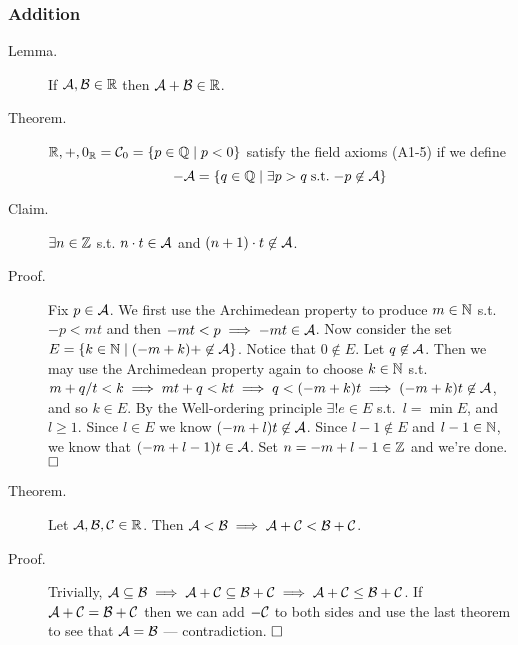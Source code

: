 \documentclass[letterpaper,11pt]{article}
\begin{document}
\subsubsection{Addition}
\begin{description}
\item[Lemma.] If $\mathcal{A},\mathcal{B}\in\mathbb{R}$ then $\mathcal{A}+\mathcal{B}\in\mathbb{R}$.


\item[Theorem.] $\mathbb{R},+,0_{\mathbb{R}}=\mathcal{C}_0=\{p\in\mathbb{Q}\;|\;p<0\}$
    satisfy the field axioms (A1-5) if we define
    \[
    -\mathcal{A}=\{q\in\mathbb{Q}\;|\;\exists p>q\;\text{s.t.}\;{-p}\not\in\mathcal{A}\}
    \]

\item[Claim.] $\exists n\in\mathbb{Z}$ s.t. $n\cdot t\in\mathcal{A}$ and $(n+1)\cdot t\not\in\mathcal{A}$.
\item[Proof.] Fix $p\in\mathcal{A}$. We first use the Archimedean property
to produce $m\in\mathbb{N}$ s.t. $-p<mt$ and then $-mt<p \implies -mt\in\mathcal{A}$.
Now consider the set $E=\{k\in\mathbb{N}\;|\;(-m+k)+\not\in\mathcal{A}\}$. Notice that
$0\not\in E$. Let $q\not\in\mathcal{A}$. Then we may use the Archimedean
property again to choose $k\in\mathbb{N}$ s.t.\
$m+q/t<k \implies mt+q<kt\implies q<(-m+k)t \implies (-m+k)t\not\in\mathcal{A}$,
and so $k\in E$. By the Well-ordering principle $\exists! e\in E$ s.t.\ $l=\min E$,
and $l\ge 1$. Since $l\in E$ we know $(-m+l)t\not\in\mathcal{A}$. Since $l-1\not\in E$ and
$l-1\in\mathbb{N}$, we know that $(-m+l-1)t\in\mathcal{A}$. Set $n=-m+l-1\in\mathbb{Z}$ and we're done.
$\hfill\square$

\item[Theorem.] Let $\mathcal{A},\mathcal{B},\mathcal{C}\in\mathbb{R}$. Then $\mathcal{A}<\mathcal{B} \implies \mathcal{A}+\mathcal{C}<\mathcal{B}+\mathcal{C}$.
\item[Proof.] Trivially, $\mathcal{A}\subseteq\mathcal{B}\implies \mathcal{A}+\mathcal{C}\subseteq\mathcal{B}+\mathcal{C}
\implies \mathcal{A}+\mathcal{C}\le\mathcal{B}+\mathcal{C}$. If $\mathcal{A}+\mathcal{C}=\mathcal{B}+\mathcal{C}$ then we can add $-\mathcal{C}$ to
both sides and use the last theorem to see that $\mathcal{A}=\mathcal{B}$ --- contradiction.
$\hfill\square$
\end{description}
\end{document}
